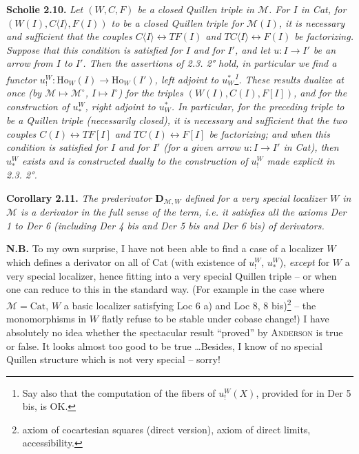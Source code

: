 \documentclass[11pt]{article}
\newcommand{\printedpage}[1]{\marginpar{\footnotesize p.~#1}}
\newcommand{\msp}[1]{\marginpar{\footnotesize [#1]}}
\newcommand{\M}{\mathcal{M}}
\newcommand{\Cat}{\mathrm{Cat}}
\newcommand{\Ho}{\mathrm{Ho}}
\begin{document}
\printedpage{19}

\msp{page 31}
\textbf{Scholie 2.10.} \textit{Let $(W,C,F)$ be a closed Quillen triple in $\M$. For $I$ in \textup{Cat}, for $(W(I),C\langle I\rangle,F(I))$ to be a closed Quillen triple for $\M(I)$, it is necessary and sufficient that the couples $C\langle I\rangle\longleftrightarrow TF(I)$ and $TC\langle I\rangle\longleftrightarrow F(I)$ be factorizing. Suppose that this condition is satisfied for $I$ and for $I'$, and let $u : I\longrightarrow I'$ be an arrow from $I$ to $I'$. Then the assertions of \textup{2.3. 2°} hold, in particular we find a functor $u^{W}_{!} : \Ho_W(I)\longrightarrow\Ho_W(I')$, left adjoint to $u^{*}_{W}$\footnote[18]{Say also that the computation of the fibers of $u^{W}_{!}(X)$, provided for in Der 5 bis, is OK.}. These results dualize at once (by $\M\longmapsto\M^{\circ}$, $I\longmapsto I^{\circ}$) for the triples $(W(I),C(I),F[I])$, and for the construction of $u^{W}_{*}$, right adjoint to $u^{*}_{W}$. In particular, for the preceding triple to be a Quillen triple (necessarily closed), it is necessary and sufficient that the two couples $C(I)\longleftrightarrow TF[I]$ and $TC(I)\longleftrightarrow F[I]$ be factorizing; and when this condition is satisfied for $I$ and for $I'$ (for a given arrow $u : I\longrightarrow I'$ in \textup{Cat}), then $u^{W}_{*}$ exists and is constructed dually to the construction of $u^{W}_{!}$ made explicit in \textup{2.3. 2°}.}

\msp{page 32}
\textbf{Corollary 2.11.} \textit{The prederivator $\mathbf{D}_{\M,W}$ defined for a \textup{very special} localizer $W$ in $\M$ is a derivator in the full sense of the term, i.e. it satisfies all the axioms Der 1 to Der 6 (including Der 4 bis and Der 5 bis and Der 6 bis) of derivators.}

\textbf{N.B.} To my own surprise, I have not been able to find a case of a localizer $W$ which defines a derivator on all of Cat (with existence of $u^{W}_{!}$, $u^{W}_{*}$), \textit{except} for $W$ a very special localizer, hence fitting into a very special Quillen triple -- or when one can reduce to this in the standard way. (For example in the case where $\M=\Cat$, $W$ a basic localizer satisfying Loc 6 a) and Loc 8, 8 bis)\footnote[19]{axiom of cocartesian squares (direct version), axiom of direct limits, accessibility.} -- the monomorphisms in $W$ flatly refuse to be stable under cobase change!) I have absolutely no idea whether the spectacular result ``proved'' by \textsc{Anderson} is true or false. It looks almost too good to be true \ldots{}Besides, I know of no special Quillen structure which is not very special -- sorry! %
\end{document}
